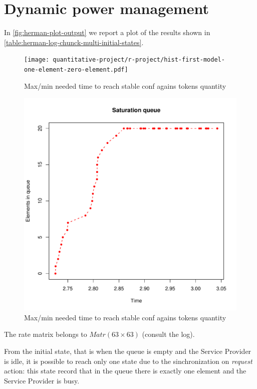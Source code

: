 \section{Dynamic power management}

In \autoref{fig:herman-plot-output} we report a plot of the results
shown in \autoref{table:herman-log-chunck-multi-initial-states}.
\begin{figure}[htb]
  \centering
  \texttt{[image: quantitative-project/r-project/hist-first-model-one-element-zero-element.pdf]}
  \caption{Max/min needed time to reach stable conf agains
    tokens quantity}
  \label{fig:herman-plot-output}
\end{figure}

\begin{figure}[htb]
  \centering
  \includegraphics[width=13cm]{quantitative-project/r-project/saturation-queue.pdf}
  \caption{Max/min needed time to reach stable conf agains
    tokens quantity}
  \label{fig:herman-plot-output}
\end{figure}

The rate matrix belongs to $Matr(63 \times 63)$ (consult the log).

From the initial state, that is when the queue is empty and the
Service Provider is idle, it is possible to reach only one state due
to the sinchronization on \emph{request} action: this state record
that in the queue there is exactly one element and the Service
Provider is busy.

